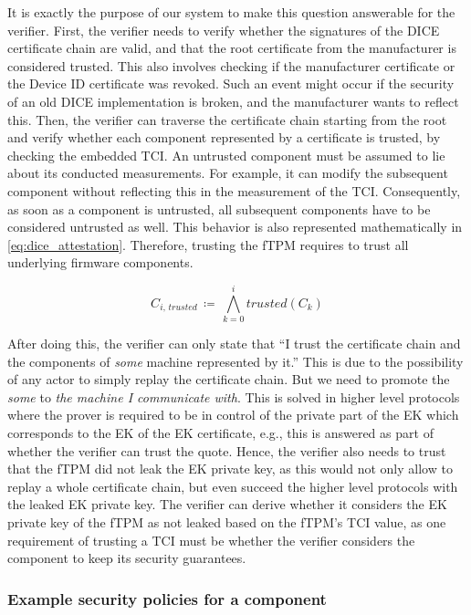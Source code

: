 It is exactly the purpose of our system to make this question answerable for the verifier.
First, the verifier needs to verify whether the signatures of the DICE certificate chain are valid, and that the root certificate from the manufacturer is considered trusted.
This also involves checking if the manufacturer certificate or the Device ID certificate was revoked.
Such an event might occur if the security of an old DICE implementation is broken, and the manufacturer wants to reflect this.
Then, the verifier can traverse the certificate chain starting from the root and verify whether each component represented by a certificate is trusted, by checking the embedded TCI\@.
An untrusted component must be assumed to lie about its conducted measurements.
For example, it can modify the subsequent component without reflecting this in the measurement of the TCI\@.
Consequently, as soon as a component is untrusted, all subsequent components have to be considered untrusted as well.
This behavior is also represented mathematically in \autoref{eq:dice_attestation}.
Therefore, trusting the fTPM requires to trust all underlying firmware components.

\begin{equation}
    \label{eq:dice_attestation}
    C_{i, \, trusted} \, \coloneqq \, \bigwedge_{k=0}^{i} trusted(C_{k})
\end{equation}

After doing this, the verifier can only state that ``I trust the certificate chain and the components of \emph{some} machine represented by it.''
This is due to the possibility of any actor to simply replay the certificate chain.
But we need to promote the \emph{some} to \emph{the machine I communicate with}.
This is solved in higher level protocols where the prover is required to be in control of the private part of the EK which corresponds to the EK of the EK certificate, e.g., this is answered as part of whether the verifier can trust the quote.
Hence, the verifier also needs to trust that the fTPM did not leak the EK private key, as this would not only allow to replay a whole certificate chain, but even succeed the higher level protocols with the leaked EK private key.
The verifier can derive whether it considers the EK private key of the fTPM as not leaked based on the fTPM's TCI value, as one requirement of trusting a TCI must be whether the verifier considers the component to keep its security guarantees.


\subsubsection{Example security policies for a component}

